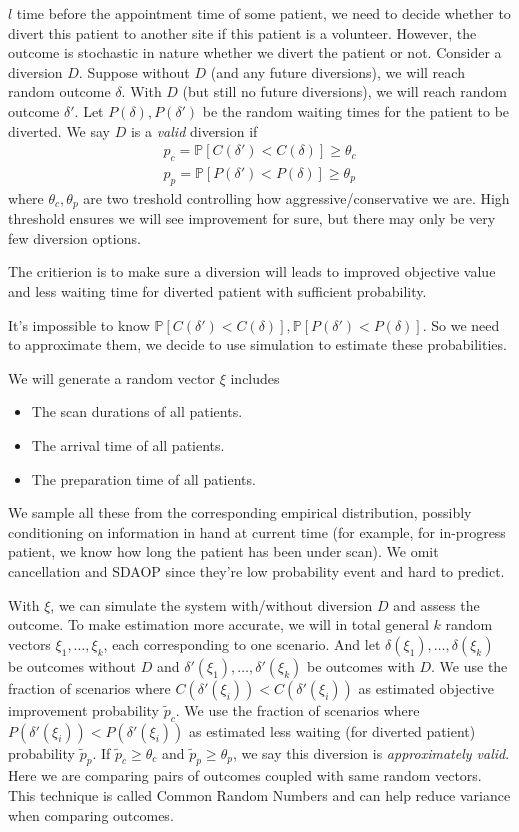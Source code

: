 $l$ time before the appointment time of some patient, we need to
decide whether to divert this patient to another site if this
patient is a volunteer. However, the outcome is stochastic in
nature whether we divert the patient or not. Consider a diversion
$D$. Suppose without $D$ (and any future diversions), we will
reach random outcome $\delta$. With $D$ (but still no future
diversions), we will reach random outcome $\delta'$. Let
$P(\delta), P(\delta')$ be the random waiting times for the patient 
to be diverted. We say $D$ is a \textit{valid} diversion if
\begin{align*}
  p_c = \mathbb{P}[C(\delta') < C(\delta)] \ge \theta_c   \\
  p_p = \mathbb{P}[P(\delta') < P(\delta)] \ge \theta_p
\end{align*}
where $\theta_c, \theta_p$ are two treshold controlling how
aggressive/conservative we are. High threshold ensures we will
see improvement for sure, but there may only be very few
diversion options.

The critierion is to make sure a diversion will leads to
improved objective value and less waiting time for diverted
patient with sufficient probability.

It's impossible to know $\mathbb{P}[C(\delta') < C(\delta)],
\mathbb{P}[P(\delta') < P(\delta)]$. So we need to approximate
them, we decide to use simulation to estimate these probabilities.

We will generate a random vector $\xi$ includes
\begin{itemize}
\item The scan durations of all patients.
\item The arrival time of all patients.
\item The preparation time of all patients.
\end{itemize}
We sample all these from the corresponding empirical distribution,
possibly conditioning on information in hand at current time
(for example, for in-progress patient, we know how long the patient
has been under scan). We omit cancellation and SDAOP since
they're low probability event and hard to predict.

With $\xi$, we can simulate the system with/without diversion $D$
and assess the outcome. To make estimation more accurate, we will
in total general $k$ random vectors $\xi_1, \ldots, \xi_k$, each
corresponding to one scenario. And let $\delta(\xi_1), \ldots,
\delta(\xi_k)$ be outcomes without $D$ and $\delta'(\xi_1), \ldots,
\delta'(\xi_k)$ be outcomes with $D$. We use the fraction of
scenarios where $C(\delta'(\xi_i)) < C(\delta'(\xi_i))$ as
estimated objective improvement probability $\tilde p_c$. We use the fraction
of scenarios where $P(\delta'(\xi_i)) < P(\delta'(\xi_i))$ as
estimated less waiting (for diverted patient) probability $\tilde p_p$.
If $\tilde p_c \ge \theta_c$ and $\tilde p_p \ge \theta_p$, we say
this diversion is \textit{approximately valid}. Here we are
comparing pairs of outcomes coupled with same random vectors.
This technique is called Common Random Numbers and can help
reduce variance when comparing outcomes.

